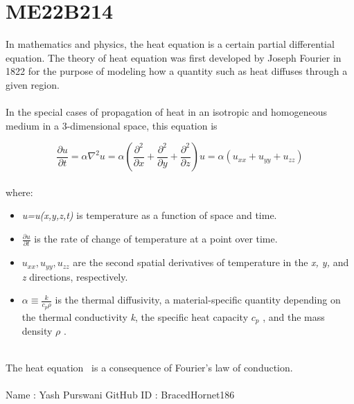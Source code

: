 \section{ME22B214}

In mathematics and physics, the heat equation is a certain partial differential equation. The theory of heat equation was first developed by Joseph Fourier in 1822 for the purpose of modeling how a quantity such as heat diffuses through a given region.
\\ \\
In the special cases of propagation of heat in an isotropic and homogeneous medium in a 3-dimensional space, this equation is

\begin{equation}
    \frac{\partial u}{\partial t} = \alpha\nabla^2u = \alpha \left(\frac{\partial^2}{\partial x}+\frac{\partial^2}{\partial y}+\frac{\partial^2}{\partial z}\right)u = \alpha(u_{xx}+u_{yy}+u_{zz})
    \label {eqn:heat}
\end{equation}
\\
where:
\begin{itemize}
    \item \emph{u=u(x,y,z,t)} is temperature as a function of space and time. 
    \item $\frac{\partial u}{\partial t}$ is the rate of change of temperature at a point over time.
    \item $u_{xx},u_{yy},u_{zz}$ are the second spatial derivatives of temperature in the \emph{x, y,} and \emph{z} directions, respectively.
    \item $\alpha \equiv \frac{k}{c_p\rho}$ is the thermal diffusivity, a material-specific quantity depending on the thermal conductivity \emph{k}, the specific heat capacity $c_p$ , and the mass density $\rho$ .
\end{itemize}
\\
The heat equation~\cite{heat_equation} is a consequence of Fourier's law of conduction.\\
\\
Name : Yash Purswani
GitHub ID : BracedHornet186




